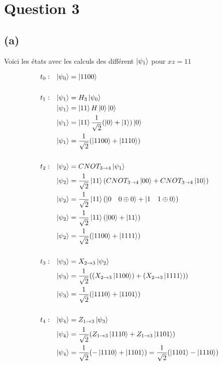 \documentclass{article}
\begin{document}
\section*{Question 3}
\subsection*{(a)}
Voici les états avec les calculs des différent $\ket{\psi_1}$ pour $xz = 11$

\begin{align*}
&t_0:&  \ket{\psi_0} &= \ket{1100} \\ \\ 
&t_1:&  \ket{\psi_1} &= H_3\ket{\psi_0} \\
&&      \ket{\psi_1} &= \ket{11}H\ket{0}\ket{0} \\
&&      \ket{\psi_1} &= \ket{11}\frac{1}{\sqrt{2}}(\ket{0} + \ket{1})\ket{0} \\
&&      \ket{\psi_1} &= \frac{1}{\sqrt{2}}(\ket{1100} + \ket{1110}) \\ \\ 
&t_2:&  \ket{\psi_2} &= CNOT_{3\rightarrow4}\ket{\psi_1} \\
&&      \ket{\psi_2} &= \frac{1}{\sqrt{2}}\ket{11}(CNOT_{3\rightarrow4}\ket{00} + CNOT_{3\rightarrow4}\ket{10}) \\
&&      \ket{\psi_2} &= \frac{1}{\sqrt{2}}\ket{11}(\ket{0 \quad 0 \oplus 0} + \ket{1 \quad 1 \oplus 0}) \\
&&      \ket{\psi_2} &= \frac{1}{\sqrt{2}}\ket{11}(\ket{00} + \ket{11}) \\
&&      \ket{\psi_2} &= \frac{1}{\sqrt{2}}(\ket{1100} + \ket{1111}) \\ \\
&t_3:&  \ket{\psi_3} &= X_{2\rightarrow3}\ket{\psi_2} \\
&&      \ket{\psi_3} &= \frac{1}{\sqrt{2}}((X_{2\rightarrow3}\ket{1100}) + (X_{2\rightarrow3}\ket{1111})) \\
&&      \ket{\psi_3} &= \frac{1}{\sqrt{2}}(\ket{1110} + \ket{1101}) \\ \\
&t_4:&  \ket{\psi_4} &= Z_{1\rightarrow3}\ket{\psi_3} \\
&&      \ket{\psi_4} &= \frac{1}{\sqrt{2}}(Z_{1\rightarrow3}\ket{1110} + Z_{1\rightarrow3}\ket{1101}) \\
&&      \ket{\psi_4} &= \frac{1}{\sqrt{2}}(-\ket{1110} + \ket{1101}) = \frac{1}{\sqrt{2}}(\ket{1101} - \ket{1110}) \\ \\
\end{align*}
\end{document}
